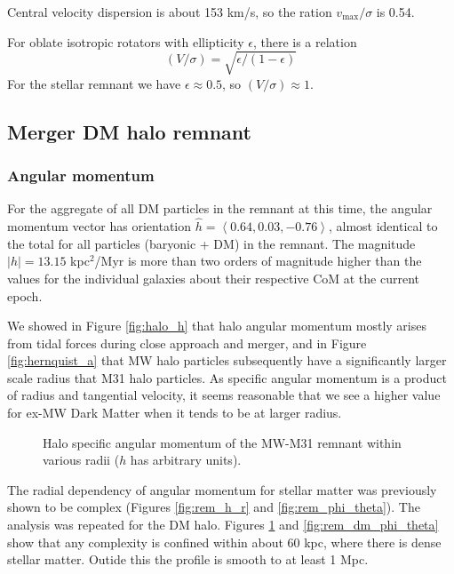 \documentclass[twocolumn]{aastex63}
\newcommand{\todo}{\color{red}{TODO}\color{black}\hspace{2mm}}
\begin{document}
Central velocity dispersion is about 153 km/s, so the ration $v_{\text{max}} / \sigma$ is 0.54.

For oblate isotropic rotators with ellipticity $\epsilon$, there is a relation \todo{Binney78 ref}
\[ (V/\sigma) = \sqrt{\epsilon / (1 - \epsilon)} \]
For the stellar remnant we have $\epsilon \approx 0.5$, so $(V/\sigma) \approx 1$.

\todo{Finish discussion}

\subsection{Merger DM halo remnant}

\subsubsection{Angular momentum}

For the aggregate of all DM particles in the remnant at this time, the angular momentum vector has orientation $\hat{h} = \left< 0.64 ,  0.03, -0.76 \right>$, almost identical to the total for all particles (baryonic + DM) in the remnant. The magnitude $|h| = 13.15$ kpc$^2$/Myr is more than two orders of magnitude higher than the values for the individual galaxies about their respective CoM at the current epoch. 

We showed in Figure \ref{fig:halo_h} that halo angular momentum mostly arises from tidal forces during close approach and merger, and in Figure \ref{fig:hernquist_a} that MW halo particles subsequently have a significantly larger scale radius that M31 halo particles. As specific angular momentum is a product of radius and tangential velocity, it seems reasonable that we see a higher value for ex-MW Dark Matter when it tends to be at larger radius.

\begin{figure}[htb!]
	\caption{Halo specific angular momentum of the MW-M31 remnant within various radii ($h$ has arbitrary units).
		\label{fig:rem_dm_h_r}}
\end{figure}

The radial dependency of angular momentum for stellar matter was previously shown to be complex (Figures \ref{fig:rem_h_r} and \ref{fig:rem_phi_theta}). The analysis was repeated for the DM halo. Figures \ref{fig:rem_dm_h_r} and \ref{fig:rem_dm_phi_theta} show that any complexity is confined within about 60 kpc, where there is dense stellar matter. Outide this the profile is smooth to at least 1 Mpc.
	
\end{document}
